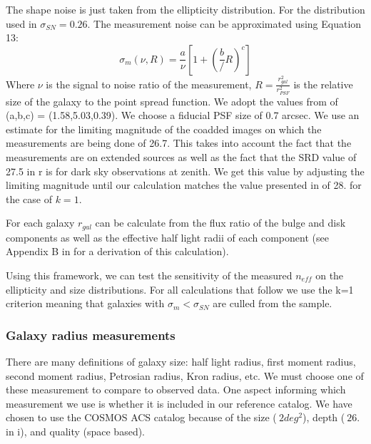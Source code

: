 \documentclass[]{article}
\begin{document}
The shape noise is just taken from the ellipticity distribution.  For the distribution used in \cite{chang} $\sigma_{SN} = 0.26$.
The measurement noise can be approximated using Equation 13:
\begin{equation}
\sigma_m(\nu,R) = \frac{a}{\nu}\left[1+\left(\frac{b}/{R}\right)^c\right]
\end{equation}
Where $\nu$ is the signal to noise ratio of the measurement, $R=\frac{r_{gal}^2}{r_{PSF}^2}$ is the relative size of the galaxy to
the point spread function.  We adopt the values from \cite{chang} of (a,b,c) = (1.58,5.03,0.39).  We choose a fiducial
PSF size of 0.7 arcsec. We use an estimate for the limiting magnitude of the coadded images on which the measurements are being
done of 26.7.  This takes into account the fact that the measurements are on extended sources as well as the fact that the SRD value 
of 27.5 in r is for dark sky observations at zenith.  We get this value by adjusting the limiting magnitude until our calculation
matches the value presented in \cite{chang} of 28. for the case of $k=1$.

For each galaxy $r_{gal}$ can be calculate from the flux ratio of the bulge and disk components as well as the effective half light 
radii of each component (see Appendix B in \cite{chang} for a derivation of this calculation).

Using this framework, we can test the sensitivity of the measured $n_{eff}$ on the ellipticity and size distributions.  For all calculations that follow we 
use the k=1 criterion meaning that galaxies with $\sigma_m < \sigma_{SN}$ are culled from the sample.

\subsubsection{Galaxy radius measurements}
There are many definitions of galaxy size: half light radius, first moment radius, second moment radius, Petrosian radius, Kron radius, etc.
We must choose one of these measurement to compare to observed data.  One aspect informing which measurement we use is whether it is included 
in our reference catalog.  We have chosen to use the COSMOS ACS catalog \cite{cosmos} because of the size ($~2deg^2$), depth ($~26.$ in i), and
quality (space based).  
\end{document}
